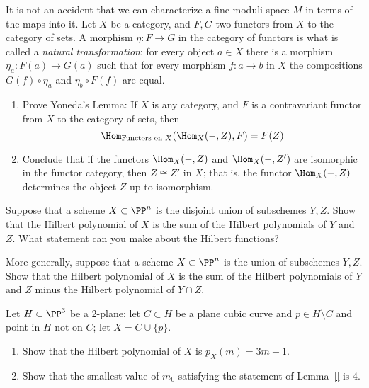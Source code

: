 \begin{exercise}
It is not an accident that we can characterize a fine moduli space $M$ in terms of the maps into it. 
 Let $X$ be a category, and $F,G$ two functors from $X$ to the category of sets.
 A morphism $\eta: F\to G$ in the category of functors is what is called a \emph{natural transformation}:
 for every object $a\in X$ there is a morphism $\eta_a:F(a) \to G(a)$ such that for every
 morphism $f: a\to b$ in $X$ the compositions $G(f)\circ \eta_a$ and $\eta_b\circ F(f)$
 are equal. 
\begin{enumerate}
 \item Prove Yoneda's Lemma: If $X$ is any category, and $F$ is a contravariant functor from $X$ to the category of sets, then 
 $$
 \Hom_{\hbox{\scriptsize Functors on $X$}}(\Hom_X( -, Z), F) = F(Z)
 $$
 \item Conclude that if the functors $\Hom_X( -, Z)$ and $\Hom_X( -, Z')$ are isomorphic in the functor category, 
 then $Z \cong Z'$ in $X$; that is, the functor $\Hom_X( -, Z)$ determines the object $Z$ up to isomorphism.
 \end{enumerate}
\end{exercise}

\begin{exercise}\label{deg of disjoint union}
Suppose that a scheme $X\subset \PP^n$ is the disjoint union of subschemes $Y,Z$. Show that the Hilbert polynomial of
$X$ is the sum of the Hilbert polynomials of $Y$ and $Z$. What statement can you make about the Hilbert functions?
\end{exercise}

\begin{exercise}
More generally, suppose that a scheme $X\subset \PP^n$ is the union of subschemes $Y,Z$. Show that the Hilbert polynomial of
$X$ is the sum of the Hilbert polynomials of $Y$ and $Z$ minus the Hilbert polynomial of $Y\cap Z$. 
\end{exercise}

\begin{exercise}
Let $H \subset \PP^3$ be a 2-plane; let $C \subset H$ be a plane cubic curve and $p \in H \setminus C$ and point in $H$ not on $C$; let $X = C \cup \{p\}$.
\begin{enumerate}
\item Show that the Hilbert polynomial of $X$ is $p_X(m) = 3m+1$.
\item Show that the smallest value of $m_0$ satisfying the statement of Lemma~\ref{} is 4.
\end{enumerate}
\end{exercise}

